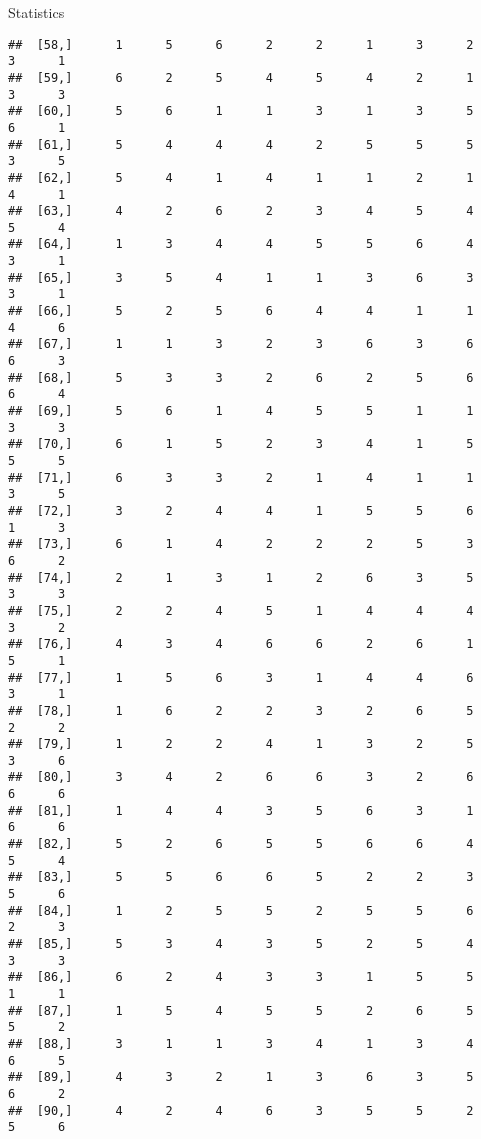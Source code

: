 \documentclass[
  ignorenonframetext,
]{beamer}
\begin{document}
\begin{frame}[fragile]{Statistics}
\begin{verbatim}
##  [58,]      1      5      6      2      2      1      3      2      3      1
##  [59,]      6      2      5      4      5      4      2      1      3      3
##  [60,]      5      6      1      1      3      1      3      5      6      1
##  [61,]      5      4      4      4      2      5      5      5      3      5
##  [62,]      5      4      1      4      1      1      2      1      4      1
##  [63,]      4      2      6      2      3      4      5      4      5      4
##  [64,]      1      3      4      4      5      5      6      4      3      1
##  [65,]      3      5      4      1      1      3      6      3      3      1
##  [66,]      5      2      5      6      4      4      1      1      4      6
##  [67,]      1      1      3      2      3      6      3      6      6      3
##  [68,]      5      3      3      2      6      2      5      6      6      4
##  [69,]      5      6      1      4      5      5      1      1      3      3
##  [70,]      6      1      5      2      3      4      1      5      5      5
##  [71,]      6      3      3      2      1      4      1      1      3      5
##  [72,]      3      2      4      4      1      5      5      6      1      3
##  [73,]      6      1      4      2      2      2      5      3      6      2
##  [74,]      2      1      3      1      2      6      3      5      3      3
##  [75,]      2      2      4      5      1      4      4      4      3      2
##  [76,]      4      3      4      6      6      2      6      1      5      1
##  [77,]      1      5      6      3      1      4      4      6      3      1
##  [78,]      1      6      2      2      3      2      6      5      2      2
##  [79,]      1      2      2      4      1      3      2      5      3      6
##  [80,]      3      4      2      6      6      3      2      6      6      6
##  [81,]      1      4      4      3      5      6      3      1      6      6
##  [82,]      5      2      6      5      5      6      6      4      5      4
##  [83,]      5      5      6      6      5      2      2      3      5      6
##  [84,]      1      2      5      5      2      5      5      6      2      3
##  [85,]      5      3      4      3      5      2      5      4      3      3
##  [86,]      6      2      4      3      3      1      5      5      1      1
##  [87,]      1      5      4      5      5      2      6      5      5      2
##  [88,]      3      1      1      3      4      1      3      4      6      5
##  [89,]      4      3      2      1      3      6      3      5      6      2
##  [90,]      4      2      4      6      3      5      5      2      5      6

\end{verbatim}
\end{frame}
\end{document}
